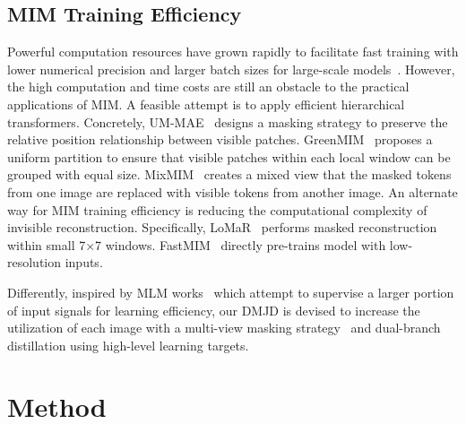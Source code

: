 \documentclass[lettersize,journal]{IEEEtran}
\begin{document}
\subsection{MIM Training Efficiency}
Powerful computation resources have grown rapidly to facilitate fast training with lower numerical precision and larger batch sizes for large-scale models~\cite{2017arXiv170602677G, 2017arXiv170508741H, 2018arXiv180711205J, 2018arXiv181106992Y, 2017arXiv170803888Y, Hoffer2020AugmentYB, 2019arXiv190205509B, 2021arXiv210513343F, 2019arXiv190705550C}. 
However, the high computation and time costs are still an obstacle to the practical applications of MIM.   
A feasible attempt is to apply efficient hierarchical transformers. Concretely, UM-MAE~\cite{2022arXiv220510063L} designs a masking strategy to preserve the relative position relationship between visible patches. 
GreenMIM~\cite{2022arXiv220513515H} proposes a uniform partition to ensure that visible patches within each local window can be grouped with equal size. 
MixMIM~\cite{2022arXiv220513137L} creates a mixed view that the masked tokens from one image are replaced with visible tokens from another image.
An alternate way for MIM training efficiency is reducing the computational complexity of invisible reconstruction. 
Specifically, LoMaR~\cite{2022arXiv220600790C} performs masked reconstruction within small 7×7 windows. 
FastMIM~\cite{2022arXiv221206593G} directly pre-trains model with low-resolution inputs.

Differently, inspired by MLM works~\cite{2020arXiv200310555C,2022arXiv220208005W} which attempt to supervise a larger portion of input signals for learning efficiency, our DMJD is devised to increase the utilization of each image with a multi-view masking strategy~\cite{8695120,9548841,8059841,9127152} and dual-branch distillation using high-level learning targets.

\section{Method}
\end{document}
